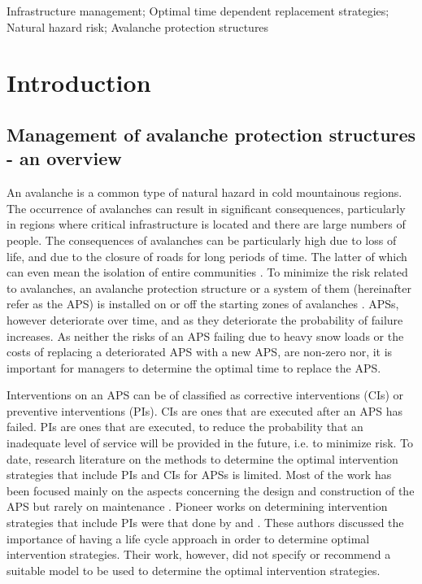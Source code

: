 \documentclass[]{article}
\begin{document}
\begin{keywords}
Infrastructure management; Optimal time dependent replacement strategies; Natural hazard risk; Avalanche protection structures
\end{keywords}


\section{Introduction}

\label{sec1} 
\subsection{Management of avalanche protection structures - an overview}

An avalanche is a common type of natural hazard in cold mountainous
regions. The occurrence of avalanches can result in significant consequences,
particularly in regions where critical infrastructure is located and
there are large numbers of people. The consequences of avalanches
can be particularly high due to loss of life, and due to the closure
of roads for long periods of time. The latter of which can even mean
the isolation of entire communities \citep{Norem1994}. To minimize
the risk related to avalanches, an avalanche protection structure
or a system of them (hereinafter refer as the APS) is installed on
or off the starting zones of avalanches \citep{Sauermoser2011}. APSs,
however deteriorate over time, and as they deteriorate the probability
of failure increases. As neither
the risks of an APS failing due to heavy snow loads or the costs of
replacing a deteriorated APS with a new APS, are non-zero nor, it
is important for managers to determine the optimal time to replace
the APS.

Interventions on an APS can be of classified as corrective interventions
(CIs) or preventive interventions (PIs). CIs are ones that are executed
after an APS has failed. PIs are ones that are executed, to reduce
the probability that an inadequate level of service will be provided
in the future, i.e. to minimize risk. To date, research literature
on the methods to determine the optimal intervention strategies that
include PIs and CIs for APSs is limited. Most of the work has been
focused mainly on the aspects concerning the design and construction
of the APS but rarely on maintenance \citep{Agerer2007,Rudolf-Miklau2008,Rudolf-Miklau2011,Margreth2007,ONR2010}.
Pioneer works on determining intervention strategies that include
PIs were that done by \citet{Rudolf-Miklau2008} and \citet{Rudolf-Miklau2011}.
These authors discussed the importance of having a life cycle approach
in order to determine optimal intervention strategies. Their work,
however, did not specify or recommend a suitable model to be used
to determine the optimal intervention strategies.
\end{document}
